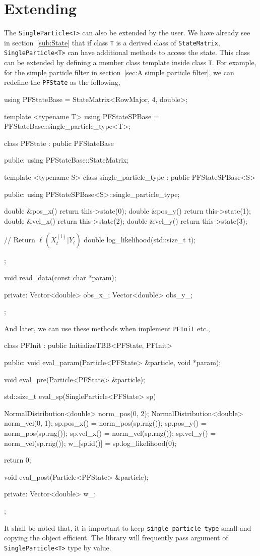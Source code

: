 \section{Extending \protect\spt}
\label{sec:Extending SP}

The \verb|SingleParticle<T>| can also be extended by the user. We have already
see in section~\ref{sub:State} that if class \verb|T| is a derived class of
\verb|StateMatrix|, \verb|SingleParticle<T>| can have additional methods to
access the state. This class can be extended by defining a member class
template inside class \verb|T|. For example, for the simple particle filter in
section~\ref{sec:A simple particle filter}, we can redefine the \verb|PFState|
as the following,
\begin{cppcode}
  using PFStateBase = StateMatrix<RowMajor, 4, double>;

  template <typename T>
  using PFStateSPBase = PFStateBase::single_particle_type<T>;

  class PFState : public PFStateBase
  {
      public:
      using PFStateBase::StateMatrix;

      template <typename S>
      class single_particle_type : public PFStateSPBase<S>
      {
          public:
          using PFStateSPBase<S>::single_particle_type;

          double &pos_x() { return this->state(0); }
          double &pos_y() { return this->state(1); }
          double &vel_x() { return this->state(2); }
          double &vel_y() { return this->state(3); }

          // Return $\ell(X_t^{(i)}|Y_t)$
          double log_likelihood(std::size_t t);
      };

      void read_data(const char *param);

      private:
      Vector<double> obs_x_;
      Vector<double> obs_y_;
  };
\end{cppcode}
And later, we can use these methods when implement \verb|PFInit| etc.,
\begin{cppcode}
  class PFInit : public InitializeTBB<PFState, PFInit>
  {
      public:
      void eval_param(Particle<PFState> &particle, void *param);

      void eval_pre(Particle<PFState> &particle);

      std::size_t eval_sp(SingleParticle<PFState> sp)
      {
          NormalDistribution<double> norm_pos(0, 2);
          NormalDistribution<double> norm_vel(0, 1);
          sp.pos_x() = norm_pos(sp.rng());
          sp.pos_y() = norm_pos(sp.rng());
          sp.vel_x() = norm_vel(sp.rng());
          sp.vel_y() = norm_vel(sp.rng());
          w_[sp.id()] = sp.log_likelihood(0);

          return 0;
      }

      void eval_post(Particle<PFState> &particle);

      private:
      Vector<double> w_;
  };
\end{cppcode}
It shall be noted that, it is important to keep \verb|single_particle_type|
small and copying the object efficient. The library will frequently pass
argument of \verb|SingleParticle<T>| type by value.

